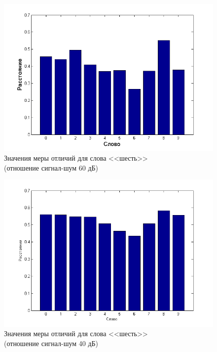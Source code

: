 \documentclass[a4paper,14pt,russian,utf8,nocolumnsxix,nocolumnxxxi,nocolumnxxxii]{eskdtext}
\begin{document}
\begin{figure}[H]	
	\centering
	\includegraphics[width=120mm]{60db_6.png}			
	\caption{Значения меры отличий для слова <<шесть>> \\ (отношение сигнал-шум 60 дБ)}
	\label{60db_6}
\end{figure}

\begin{figure}[H]	
	\centering
	\includegraphics[width=120mm]{40db_6.png}			
	\caption{Значения меры отличий для слова <<шесть>> \\ (отношение сигнал-шум 40 дБ)}
	\label{40db_6}
\end{figure}
\end{document}
